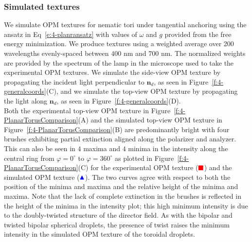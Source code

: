 \subsubsection{Simulated textures}
We simulate OPM textures for nematic tori under tangential anchoring using the ansatz in Eq~\ref{e:4-planransatz} with values of $\omega$ and $g$ provided from the free energy minimization.
We produce textures using a weighted average over 200 wavelengths evenly-spaced between $400$ nm and $700$ nm.
The normalized weights are provided by the spectrum of the lamp in the microscope used to take the experimental OPM textures.
We simulate the side-view OPM texture by propagating the incident light perpendicular to $\mathbf{n}_d$, as seen in Figure~\ref{f:4-generalcoords}(C), and we simulate the top-view OPM texture by propagating the light along $\mathbf{n}_d$, as seen in Figure~\ref{f:4-generalcoords}(D).\\

Both the experimental top-view OPM texture in Figure~\ref{f:4-PlanarTorusComparison}(A) and the simulated top-view OPM texture in Figure~\ref{f:4-PlanarTorusComparison}(B) are predominantly bright with four brushes exhibiting partial extinction aligned along the polarizer and analyzer.
This can also be seen in $4$ maxima and $4$ minima in the intensity along the central ring from $\varphi=0^{\circ}$ to $\varphi=360^{\circ}$ as plotted in Figure~\ref{f:4-PlanarTorusComparison}(C) for the experimental OPM texture ($\color{red}\blacksquare$) and the simulated OPM texture ($\color{blue}\blacktriangle$).
The two curves agree with respect to both the position of the minima and maxima and the relative height of the minima and maxima.
Note that the lack of complete extinction in the brushes is reflected in the height of the minima in the intensity plot; this high minimum intensity is due to the doubly-twisted structure of the director field.
As with the bipolar and twisted bipolar spherical droplets, the presence of twist raises the minimum intensity in the simulated OPM texture of the toroidal droplets.

